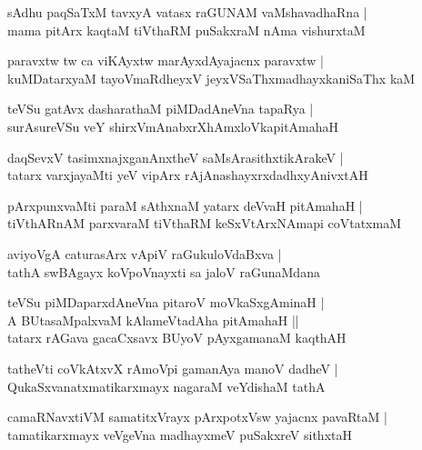 \begin{shloka}
sAdhu paqSaTxM tavxyA vatasx raGUNAM vaMshavadhaRna |\\
mama pitArx kaqtaM tiVthaRM puSakxraM nAma vishurxtaM 
\end{shloka}

\begin{shloka}
paravxtw tw ca viKAyxtw marAyxdAyajacnx paravxtw |\\
kuMDatarxyaM tayoVmaRdheyxV jeyxVSaThxmadhayxkaniSaThx kaM 
\end{shloka}

\begin{shloka}
teVSu gatAvx dasharathaM piMDadAneVna tapaRya |\\
surAsureVSu veY shirxVmAnabxrXhAmxloVkapitAmahaH 
\end{shloka}

\begin{shloka}
daqSevxV tasimxnajxganAnxtheV saMsArasithxtikArakeV |\\
tatarx varxjayaMti yeV vipArx rAjAnashayxrxdadhxyAnivxtAH
\end{shloka}

\begin{shloka}
pArxpunxvaMti paraM sAthxnaM yatarx deVvaH pitAmahaH |\\
tiVthARnAM parxvaraM tiVthaRM keSxVtArxNAmapi coVtatxmaM 
\end{shloka}

\begin{shloka}
aviyoVgA caturasArx vApiV raGukuloVdaBxva |\\
tathA swBAgayx koVpoVnayxti sa jaloV raGunaMdana
\end{shloka}

\begin{shloka}
teVSu piMDaparxdAneVna pitaroV moVkaSxgAminaH |\\
A BUtasaMpalxvaM kAlameVtadAha pitAmahaH ||\\
tatarx rAGava gacaCxsavx BUyoV pAyxgamanaM kaqthAH
\end{shloka}

\begin{shloka}
tatheVti coVkAtxvX rAmoVpi gamanAya manoV dadheV |\\
QukaSxvanatxmatikarxmayx nagaraM veYdishaM tathA
\end{shloka}

\begin{shloka}
camaRNavxtiVM samatitxVrayx pArxpotxVsw yajacnx pavaRtaM |\\
tamatikarxmayx veVgeVna madhayxmeV puSakxreV sithxtaH 
\end{shloka}

